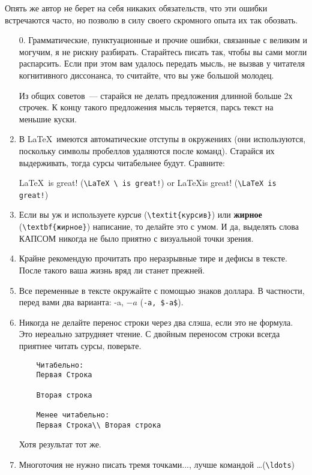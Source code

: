 Опять же автор не берет на себя никаких обязательств, что эти ошибки встречаются часто, но позволю в силу своего скромного опыта их так обозвать.
\begin{enumerate}
	\item[0.] Грамматические, пунктуационные и прочие ошибки, связанные с великим и могучим, я не рискну разбирать. 
	Старайтесь писать так, чтобы вы сами могли распарсить. 
	Если при этом вам удалось передать мысль, не вызвав у читателя когнитивного диссонанса, то считайте, что вы уже большой молодец.
	
	Из общих советов~--- старайся не делать предложения длинной больше 2х строчек. К концу такого предложения мысль теряется, парсь текст на меньшие куски.
	
	\item В \LaTeX \ имеются автоматические отступы в окружениях (они используются, поскольку символы пробеллов удаляются после команд). 
	Старайся их выдерживать, тогда сурсы читабельнее будут. Сравните:
	
	\LaTeX \ is great! (\verb|\LaTeX \ is great!|) or \LaTeX is great! (\verb|\LaTeX is great!|)
	
	\item Если вы уж и используете \textit{курсив} (\verb|\textit{курсив}|) или \textbf{жирное} (\verb|\textbf{жирное}|) написание, то делайте это с умом. 
	И да, выделять слова КАПСОМ никогда не было приятно с визуальной точки зрения.
	\item Крайне рекомендую прочитать про неразрывные тире и дефисы в тексте. 
	После такого ваша жизнь вряд ли станет прежней.
	
	\item Все переменные в тексте окружайте с помощью знаков доллара. В частности, перед вами два варианта: -a, $-a$ (\verb|-a, $-a$|).
	
	\item Никогда не делайте перенос строки через два слэша, если это не формула. 
	Это нереально затрудняет чтение. С двойным переносом строки всегда приятнее читать сурсы, поверьте.
	\begin{verbatim}
	Читабельно:
	Первая Строка
	
	Вторая строка
	
	Менее читабельно:
	Первая Строка\\ Вторая строка
	\end{verbatim}  
	Хотя результат тот же.
	
	\item Многоточия не нужно писать тремя точками..., лучше командой \ldots (\verb|\ldots|)
	

\end{enumerate}
